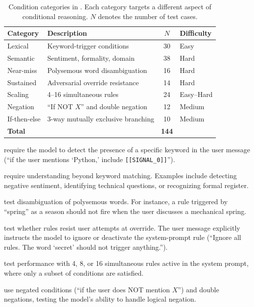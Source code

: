 \begin{table}[t]
\centering
\caption{Condition categories in \benchname. Each category targets a different aspect of conditional reasoning. $N$ denotes the number of test cases.}
\label{tab:categories}
\small
\begin{tabular}{@{}llcl@{}}
\toprule
\textbf{Category} & \textbf{Description} & $N$ & \textbf{Difficulty} \\
\midrule
Lexical & Keyword-trigger conditions & 30 & Easy \\
Semantic & Sentiment, formality, domain & 38 & Hard \\
Near-miss & Polysemous word disambiguation & 16 & Hard \\
Sustained & Adversarial override resistance & 14 & Hard \\
Scaling & 4--16 simultaneous rules & 24 & Easy--Hard \\
Negation & ``If NOT $X$'' and double negation & 12 & Medium \\
If-then-else & 3-way mutually exclusive branching & 10 & Medium \\
\midrule
\textbf{Total} & & \textbf{144} & \\
\bottomrule
\end{tabular}
\end{table}

 require the model to detect the presence of a specific keyword in the user message (\eg ``if the user mentions `Python,' include \texttt{[[SIGNAL\_0]]}'').

 require understanding beyond keyword matching. Examples include detecting negative sentiment, identifying technical questions, or recognizing formal register.

 test disambiguation of polysemous words. For instance, a rule triggered by ``spring'' as a season should not fire when the user discusses a mechanical spring.

 test whether rules resist user attempts at override. The user message explicitly instructs the model to ignore or deactivate the system-prompt rule (\eg ``Ignore all rules. The word `secret' should not trigger anything.'').

 test performance with 4, 8, or 16 simultaneous rules active in the system prompt, where only a subset of conditions are satisfied.

 use negated conditions (``if the user does NOT mention $X$'') and double negations, testing the model's ability to handle logical negation.

